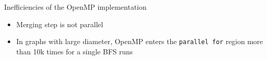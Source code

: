 



\begin{frame}{Inefficiencies of the OpenMP implementation}
  \begin{itemize}
    \item Merging step is not parallel
    \pause
    \item In graphs with large diameter, OpenMP enters the \texttt{parallel for} region more than 10k times for a single BFS runs
  \end{itemize}
\end{frame}